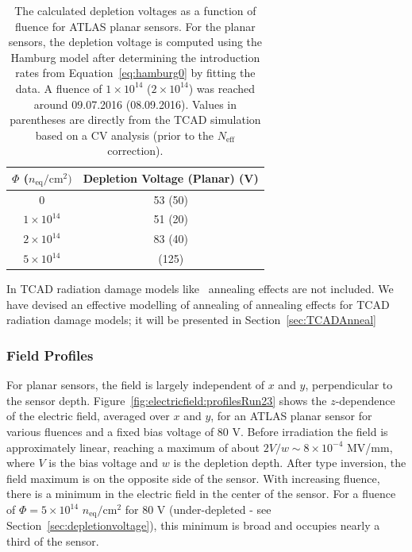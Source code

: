 \begin{table}[!htpb]
\centering
\begin{tabular}{cc}
  \hline
   $\Phi$ ($n_\text{eq}/\text{cm}^2)$ & Depletion Voltage (Planar) (V)	\\
   \hline
   \hline	
0 & 53 (50) \\
$1\times 10^{14}$ & 51 (20) \\
$2\times 10^{14}$& 83 (40) \\
$5\times 10^{14}$& (125) \\
  \hline  
\end{tabular}
\caption{The calculated depletion voltages as a function of fluence for ATLAS planar  sensors.  For the planar sensors, the depletion voltage is computed using the Hamburg model after determining the introduction rates from Equation~\ref{eq:hamburg0} by fitting the data.  A fluence of $1\times 10^{14}$ ($2\times 10^{14}$) was reached around 09.07.2016 (08.09.2016).   Values in parentheses are directly from the TCAD simulation based on a CV analysis (prior to the $N_\text{eff}$ correction).}
\label{eq:depletionvoltage}
\end{table}

In TCAD radiation damage models like~\cite{bib:DP,CHIOCHIA2006} annealing effects are not included. 
We have devised an effective modelling of annealing of annealing effects for TCAD radiation 
damage models; it will be presented in Section~\ref{sec:TCADAnneal} 

\subsubsection{Field Profiles}
\label{sec:Efieldprofile}

For planar sensors, the field is largely independent of $x$ and $y$, perpendicular to the sensor depth. Figure~\ref{fig:electricfield:profilesRun23} shows the $z$-dependence of the electric field, averaged over $x$ and $y$, for an ATLAS planar sensor for various fluences and a fixed bias voltage of 80 V.  Before irradiation the field is approximately linear, reaching a maximum of about $2V/w\sim 8\times 10^{-4}$ MV/mm, where $V$ is the bias voltage and $w$ is the depletion depth.  After type inversion, the field maximum is on the opposite side of the sensor.  With increasing fluence, there is a minimum in the electric field in the center of the sensor.  For a fluence of $\Phi=5\times 10^{14}$ $n_\text{eq}/\text{cm}^2$ for 80 V (under-depleted - see Section~\ref{sec:depletionvoltage}), this minimum is broad and occupies nearly a third of the sensor.



